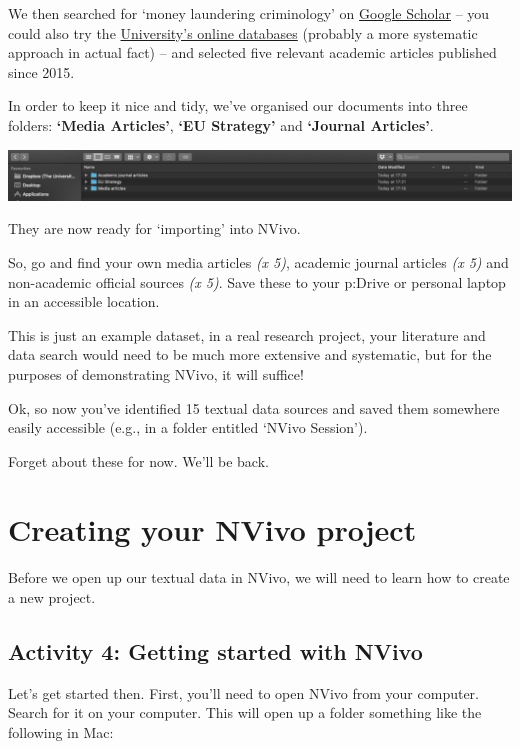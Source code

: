 \documentclass[
]{book}
\begin{document}
We then searched for `money laundering criminology' on \href{https://scholar.google.com/}{Google Scholar} -- you could also try the \href{https://www.librarysearch.manchester.ac.uk/}{University's online databases} (probably a more systematic approach in actual fact) -- and selected five relevant academic articles published since 2015.

In order to keep it nice and tidy, we've organised our documents into three folders: \textbf{`Media Articles'}, \textbf{`EU Strategy'} and \textbf{`Journal Articles'}.

\includegraphics{imgs/nice_tidy.png}

They are now ready for `importing' into NVivo.

So, go and find your own media articles \emph{(x 5)}, academic journal articles \emph{(x 5)} and non-academic official sources \emph{(x 5)}. Save these to your p:Drive or personal laptop in an accessible location.

This is just an example dataset, in a real research project, your literature and data search would need to be much more extensive and systematic, but for the purposes of demonstrating NVivo, it will suffice!

Ok, so now you've identified 15 textual data sources and saved them somewhere easily accessible (e.g., in a folder entitled `NVivo Session').

Forget about these for now. We'll be back.

\hypertarget{creating-your-nvivo-project}{%
\section{Creating your NVivo project}\label{creating-your-nvivo-project}}

Before we open up our textual data in NVivo, we will need to learn how to create a new project.

\hypertarget{activity-4-getting-started-with-nvivo}{%
\subsection{Activity 4: Getting started with NVivo}\label{activity-4-getting-started-with-nvivo}}

Let's get started then. First, you'll need to open NVivo from your computer. Search for it on your computer. This will open up a folder something like the following in Mac:
\end{document}
